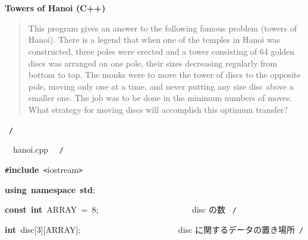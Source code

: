 \documentclass[a4paper,10pt]{article}
\def\mc{\relax}
\begin{document}
\tt\mc 

\noindent
\mbox{}\rm\mc {\tt /}{\tt *}\  \hrulefill *
\tt\mc 

\noindent
\mbox{}\hfill

\noindent
\mbox{}\rm\mc \ %

\centerline{\bf Towers of Hanoi (C++)}

\begin{quote}

This program gives an answer to the following famous problem (towers of
Hanoi).
There is a legend that when one of the temples in Hanoi was constructed,
three poles were erected and a tower consisting of 64 golden discs was
arranged on one pole, their sizes decreasing regularly from bottom to top.
The monks were to move the tower of discs to the opposite pole, moving
only one at a time, and never putting any size disc above a smaller one.
The job was to be done in the minimum numbers of moves. What strategy for
moving discs will accomplish this optimum transfer?
\end{quote}

\tt\mc 

\noindent
\mbox{}\hfill

\noindent
\mbox{}\rm\mc {\tt *} \hrulefill \rm\mc \ {\tt *}{\tt /}
\tt\mc 

\noindent
\mbox{}\hfill

\noindent
\mbox{}\rm\mc {\tt /}{\tt *}\  \hrulefill\ hanoi.cpp \ \hrulefill \rm\mc \ {\tt *}{\tt /}
\tt\mc 

\noindent
\mbox{}\hfill

\noindent
\mbox{}{\tt\#}\textbf{include}{\tt\mc \ }{\tt <}iostream{\tt >}

\noindent
\mbox{}\hfill

\noindent
\mbox{}\textbf{using}{\tt\mc \ }\textbf{namespace}{\tt\mc \ }\textbf{std};

\noindent
\mbox{}\hfill

\noindent
\mbox{}\textbf{const}{\tt\mc \ }\textbf{int}{\tt\mc \ }ARRAY{\tt\mc \ }={\tt\mc \ }8;{\tt\mc \ }{\tt\mc \ }{\tt\mc \ }{\tt\mc \ }{\tt\mc \ }{\tt\mc \ }{\tt\mc \ }{\tt\mc \ }{\tt\mc \ }{\tt\mc \ }{\tt\mc \ }{\tt\mc \ }{\tt\mc \ }{\tt\mc \ }{\tt\mc \ }{\tt\mc \ }{\tt\mc \ }{\tt\mc \ }{\tt\mc \ }{\tt\mc \ }\rm\mc {\tt /}{\tt *}\  \ disc の数 \hfill \rm\mc \ {\tt *}{\tt /}
\tt\mc 

\noindent
\mbox{}\hfill

\noindent
\mbox{}\textbf{int}{\tt\mc \ }disc[3][ARRAY];{\tt\mc \ }{\tt\mc \ }{\tt\mc \ }{\tt\mc \ }{\tt\mc \ }{\tt\mc \ }{\tt\mc \ }{\tt\mc \ }{\tt\mc \ }{\tt\mc \ }{\tt\mc \ }{\tt\mc \ }{\tt\mc \ }{\tt\mc \ }{\tt\mc \ }{\tt\mc \ }{\tt\mc \ }{\tt\mc \ }{\tt\mc \ }{\tt\mc \ }{\tt\mc \ }\rm\mc {\tt /}{\tt *}\  \ disc に関するデータの置き場所\hfill \rm\mc \ {\tt *}{\tt /}
\tt\mc 
\end{document}
